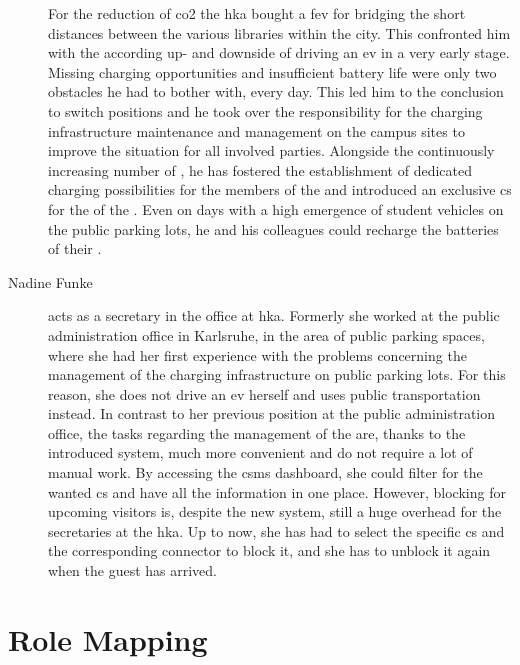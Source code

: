 \begin{description}
    For the reduction of \acrshort{co2} the \acrshort{hka} bought a \acrshort{fev} for bridging the short distances between the various libraries within the city. 
    This confronted him with the according up- and downside of driving an \acrshort{ev} in a very early stage. 
    Missing charging opportunities and insufficient battery life were only two obstacles he had to bother with, every day. 
    This led him to the conclusion to switch positions and he took over the responsibility for the charging infrastructure maintenance and management on the campus sites to improve the situation for all involved parties. 
    Alongside the continuously increasing number of , he has fostered the establishment of dedicated charging possibilities for the members of the  and introduced an exclusive \acrshort{cs} for the  of the . 
    Even on days with a high emergence of student vehicles on the public parking lots, he and his colleagues could recharge the batteries of their . 
    \item[Nadine Funke] acts as a secretary in the  office at \acrshort{hka}. Formerly she worked at the public administration office in Karlsruhe, in the area of public parking spaces, where she had her first experience with the problems concerning the management of the charging infrastructure on public parking lots. 
    For this reason, she does not drive an \acrshort{ev} herself and uses public transportation instead. In contrast to her previous position at the public administration office, the tasks regarding the management of the  are, thanks to the introduced system, much more convenient and do not require a lot of manual work. 
    By accessing the \acrshort{csms} dashboard, she could filter for the wanted \acrshort{cs} and have all the information in one place. 
    However, blocking  for upcoming visitors is, despite the new system, still a huge overhead for the secretaries at the \acrshort{hka}. 
    Up to now, she has had to select the specific \acrshort{cs} and the corresponding connector to block it, and she has to unblock it again when the guest has arrived.
\end{description}

\section{Role Mapping}
\label{ch:Requirements Engineering:sec:Role Mapping}


